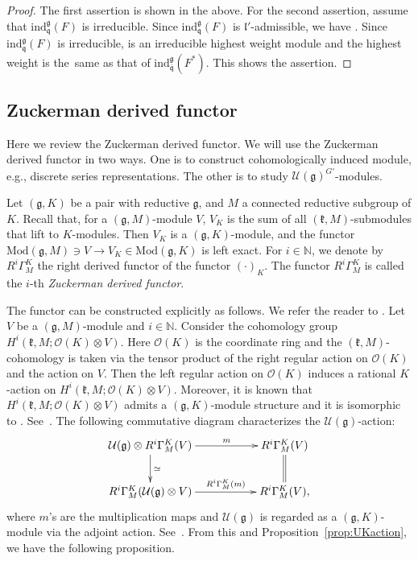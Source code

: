 \documentclass[11pt]{article}
\numberwithin{equation}{section}
\numberwithin{equation}{section}
\theoremstyle{definition}
\newcommand{\BasicRing}[1]{\mathbb{#1}}
\newcommand{\NN}{\BasicRing{N}}
\newcommand{\Mod}{\mathrm{Mod}}
\newcommand{\lieC}[1]{\mathfrak{#1}}
\newcommand{\lie}[1]{\mathfrak{#1}}
\newcommand{\univ}[1]{\mathcal{U}(\lieC{#1})}
\newcommand{\ind}[2]{\mathrm{ind}^{\lieC{#1}}_{\lieC{#2}}}
\newcommand{\zuck}[2]{\Gamma^{#1}_{#2}}
\newcommand{\Dzuck}[3]{R^{#3}\zuck{#1}{#2}}
\newcommand{\regular}{\mathcal{O}}
\newcommand{\rring}[1]{\regular(#1)}
\begin{document}
\begin{proof}
	The first assertion is shown in the above.
	For the second assertion, assume that $\ind{g}{q}(F)$ is irreducible.
	Since $\ind{g}{q}(F)$ is $\lie{l'}$-admissible, we have \smash{$\bigl(\ind{g}{q}(F)^*\bigr)_{\lie{l'}} = \bigl(\ind{g}{q}(F)^*\bigr)_{\lie{l}}$}.
	Since $\ind{g}{q}(F)$ is irreducible, \smash{$\bigl(\ind{g}{q}(F)^*\bigr)_{\lie{l}}$} is an irreducible highest weight module
	and the highest weight is the~same as that of $\ind{g}{\overline{q}}(F^*)$.
	This shows the assertion.
\end{proof}

\subsection{Zuckerman derived functor}

Here we review the Zuckerman derived functor.
We will use the Zuckerman derived functor in two ways.
One is to construct cohomologically induced module, e.g., discrete series representations.
The other is to study $\univ{g}^{G'}$-modules.

Let $(\lie{g}, K)$ be a pair with reductive $\lie{g}$,
and $M$ a connected reductive subgroup of $K$.
Recall that, for a $(\lie{g}, M)$-module $V$, $V_K$ is the sum of all $(\lie{k}, M)$-submodules that lift to $K$-modules.
Then $V_K$ is a $(\lie{g}, K)$-module,
and the functor $\Mod(\lie{g}, M) \ni V \rightarrow V_K \in \Mod(\lie{g}, K)$ is left exact.
For $i \in \NN$, we denote by $\Dzuck{K}{M}{i}$ the right derived functor of the functor $(\cdot)_K$.
The functor $\Dzuck{K}{M}{i}$ is called the $i$-th \emph{Zuckerman derived functor}.

The functor can be constructed explicitly as follows.
We refer the reader to \cite[Section~I.8]{BoWa00_continuous_cohomology}.
Let $V$ be a $(\lie{g}, M)$-module and $i \in \NN$.
Consider the cohomology group $H^i(\lie{k}, M; \rring{K}\otimes V)$.
Here $\rring{K}$ is the coordinate ring and the $(\lie{k}, M)$-cohomology is taken via the tensor product of the right regular action on $\rring{K}$ and the action on $V$.
Then the left regular action on $\rring{K}$ induces a rational $K$-action on $H^i(\lie{k}, M; \rring{K}\otimes V)$.
Moreover, it is known that $H^i(\lie{k}, M; \rring{K}\otimes V)$ admits a $(\lie{g}, K)$-module structure and it is isomorphic to \smash{$\Dzuck{K}{M}{i}(V)$}.
See~\cite[Proposition~I.8.2]{BoWa00_continuous_cohomology}.
The following commutative diagram characterizes the $\univ{g}$-action:
\begin{align*}
	\xymatrix{
		\univ{g}\otimes \Dzuck{K}{M}{i}(V) \ar[d]^{\simeq} \ar[rr]^-m && \Dzuck{K}{M}{i}(V) \ar@{=}[d] \\
		\Dzuck{K}{M}{i}(\univ{g}\otimes V) \ar[rr]^-{\Dzuck{K}{M}{i}(m)} && \Dzuck{K}{M}{i}(V),
	}
\end{align*}
where $m$'s are the multiplication maps and $\univ{g}$ is regarded as a $(\lie{g}, K)$-module via the adjoint action.
See~\cite[Lemma~6.3.1]{Wa88_real_reductive_I}.
From this and Proposition~\ref{prop:UKaction}, we have the following proposition.
\end{document}
